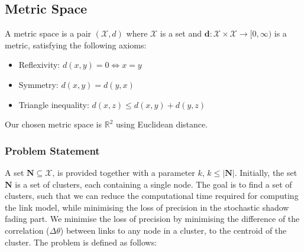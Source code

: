 \subsection{Metric Space}
A metric space is a pair $( \mathcal{X}, d )$ where $ \mathcal{X} $ is a set and $\textbf{d}:\mathcal{X} \times \mathcal{X} \rightarrow [0, \infty )$ is a metric, satisfying the following axioms:

\begin{itemize}
    \item Reflexivity: $d(x, y) = 0 \Longleftrightarrow x = y$
    \item Symmetry: $d(x, y) = d(y, x)$
    \item Triangle inequality: $d(x, z) \leq d(x, y) + d(y, z)$
\end{itemize}

Our chosen metric space is $\mathbb{R}^2$ using Euclidean distance.


\subsubsection{Problem Statement}

A set $\textbf{N} \subseteq \mathcal{X}$, is provided together with a parameter $k$, $k \leq |\textbf{N}|$. Initially, the set $\textbf{N}$ is a set of clusters, each containing a single node. The goal is to find a set of clusters, such that we can reduce the computational time required for computing the link model, while minimising the loss of precision in the stochastic shadow fading part. We minimise the loss of precision by minimising the difference of the correlation ($\Delta\theta$) between links to any node in a cluster, to the centroid of the cluster. The problem is defined as follows: \smallbreak




